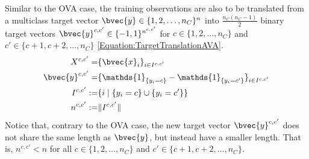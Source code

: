 				Similar to the OVA case, the training observations are also to be translated from a multiclass target vector $\bvec{y} \in \{1, 2, \dots, n_{C}\}^{n}$ into $\frac{n_{C} (n_{C} - 1)}{2}$ binary target vectors $\bvec{y}^{c, c'} \in \{-1, 1\}^{n^{c, c'}}$ for $c \in \{1, 2, \dots, n_{C}\}$ and $c' \in \{c + 1, c + 2, \dots, n_{C}\}$ \eqref{Equation:TargetTranslationAVA}. \begin{equation}
					\begin{aligned}
						X^{c, c'} =& \{\bvec{x}_{i}\}_{i \in I^{c, c'}} \\
						\bvec{y}^{c, c'} =& \{\mathds{1}_{\{y_{i} = c\}} - \mathds{1}_{\{y_{i} = c'\}}\}_{i \in I^{c, c'}} \\
						I^{c, c'} :=& \{i \; | \; \{y_{i} = c\} \cup \{y_{i} = c'\} \} \\
						n^{c, c'} :=& \Vert I^{c, c'} \Vert
					\end{aligned}
				\label{Equation:TargetTranslationAVA}
				\end{equation} Notice that, contrary to the OVA case, the new target vector $\bvec{y}^{c, c'}$ does not share the same length as $\bvec{y}$, but instead have a smaller length. That is, $n^{c, c'} < n$ for all $c \in \{1, 2, \dots, n_{C}\}$ and $c' \in \{c + 1, c + 2, \dots, n_{C}\}$.
				
